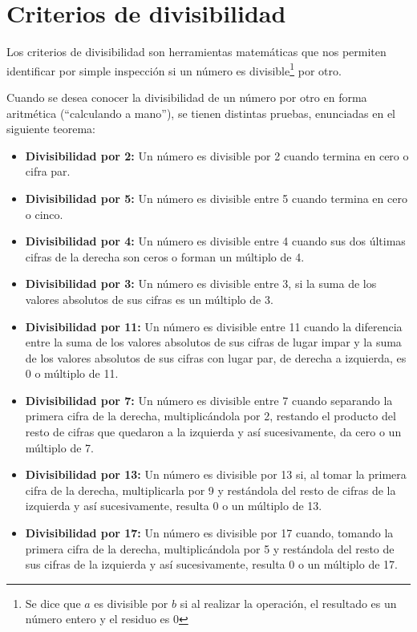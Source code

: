 \section{Criterios de divisibilidad}

Los criterios de divisibilidad son herramientas matem\'aticas que nos permiten
identificar por simple inspecci\'on si un n\'umero es divisible\footnote{Se dice
que $a$ es divisible por $b$ si al realizar la operaci\'on, el resultado es un
n\'umero entero y el residuo es 0} por otro.

Cuando se desea conocer la divisibilidad de un n\'umero por otro en forma
aritm\'etica (``calculando a mano''), se tienen distintas pruebas, enunciadas en
el siguiente teorema:


	\begin{itemize}
\item \textbf{Divisibilidad por 2:} Un n\'umero es divisible por 2 cuando
termina en cero o cifra par.
\item \textbf{Divisibilidad por 5:} Un n\'umero es divisible entre 5 cuando
termina en cero o cinco.
\item \textbf{Divisibilidad por 4:} Un n\'umero es divisible entre 4 cuando sus
dos \'ultimas cifras de la derecha son ceros o forman un m\'ultiplo de 4.
\item  \textbf{Divisibilidad por 3:} Un n\'umero es divisible entre 3, si la
suma de los valores absolutos de sus cifras es un m\'ultiplo de 3.
\item \textbf{Divisibilidad por 11:} Un n\'umero es divisible entre 11 cuando la
diferencia entre la suma de los valores absolutos de sus cifras de lugar impar y
la suma de los valores absolutos de sus cifras con lugar par, de derecha a
izquierda, es 0 o m\'ultiplo de 11.
\item \textbf{Divisibilidad por 7:} Un n\'umero es divisible entre 7 cuando
separando la primera cifra de la derecha, multiplic\'andola por 2, restando el
producto del resto de cifras que quedaron a la izquierda y as\'i sucesivamente,
da cero o un m\'ultiplo de 7.		
\item \textbf{Divisibilidad por 13:} Un n\'umero es divisible por 13 si, al
tomar la primera cifra de la derecha, multiplicarla por 9 y rest\'andola del
resto de cifras de la izquierda y as\'i sucesivamente, resulta 0 o un m\'ultiplo
de 13.
\item \textbf{Divisibilidad por 17:} Un n\'umero es divisible por 17 cuando,
tomando la primera cifra de la derecha, multiplic\'andola por 5 y rest\'andola
del resto de sus cifras de la izquierda y as\'i sucesivamente, resulta 0 o un
m\'ultiplo de 17.
	\end{itemize}

